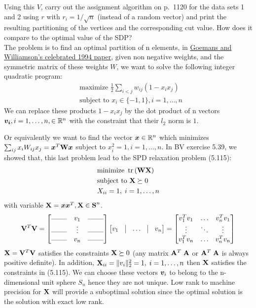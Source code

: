 \documentclass[11pt]{article}
\newcommand{\R}{\mathbb R}
\newcommand{\st}{\text{subject to }}
\newcommand{\minz}{\text{minimize }}
\begin{document}
\begin{enumerate}
\begin{enumerate}
 Using this $V$, carry out the assignment algorithm on p.~1120 for the data sets 1 and 2 using $r$ with $r_i=1/\sqrt{n}$ 
 (instead of a random vector) and print the resulting partitioning of the
 vertices and the corresponding cut value. How does it compare to the optimal value of the SDP?\\
 
 \medskip
The problem is to find an optimal partition of n elements, in  \href{http://www-math.mit.edu/~goemans/PAPERS/maxcut-jacm.pdf}{Goemans and Williamson's celebrated 1994 paper},
given non negative weights, and the symmetric matrix of these weights $W$,  
we want to solve the following integer quadratic program:
\begin{align*}
	& \text{maximize } \frac{1}{2} \sum_{i<j} w_{ij} (1- x_i x_j) \\
	& \st x_i \in \{-1,1\}, i=1, \ldots,n
\end{align*}
We can replace these products $1 -x_i x_j$ by the dot product of n vectors $\vect{v_i},  i=1, \ldots,n, \in \R^n$ with the constraint that their $l_2$ norm is $1$.

Or equivalently we want to find the vector $\vect{x} \in \R^n$ which minimizes $\sum_{ij} x_i W_{ij} x_j = \bm{x}^T {\mathbf W} \bm{x}$ subject to $x_i^2 = 1, i=1, \ldots,n$.
In BV exercise 5.39, we showed that, this last problem lead to the SPD relaxation problem (5.115):
\begin{align*}
	& \minz \tr{\mat{W} \mat{ X}} \\
	& \st\mat{X} \succeq 0\\
	&	X_{ii} = 1, \; i =1, \ldots, n
\end{align*}
with variable ${\mathbf X}= \bm{x} \bm{x}^T,  {\mathbf X} \in \textbf{S}^n $.
$$
	\mat{V}^T \mat{V} = 
		\begin{bmatrix}
			 \rule[0.5mm]{0.8cm}{0.1mm} 	& v_1 	&  \rule[0.5mm]{0.8cm}{0.1mm} \\
			\rule[0.5mm]{0.8cm}{0.1mm}	& \vdots 	&  \rule[0.5mm]{0.8cm}{0.1mm}	 \\
			\rule[0.5mm]{0.8cm}{0.1mm}	& v_n 	&  \rule[0.5mm]{0.8cm}{0.1mm} \\
		\end{bmatrix}
		\begin{bmatrix}
			v_1 & \vline & \ldots & \vline  & v_n
		\end{bmatrix}
		=
		\begin{bmatrix}
			v_1^T v_1 	& 	\ldots 	& 	v_n^T v_1 	\\
			\vdots		&	\ddots	& 	\vdots		\\
			v_1^T v_n	 	& 	\ldots 	& 	v_n^T v_n
		\end{bmatrix}
$$	
${\mathbf X} = {\mathbf V}^T {\mathbf V} $ satisfies the constraints ${\mathbf X} \succeq 0$ (any matrix ${\mathbf A}^T \; {\mathbf A}$ or ${\mathbf A}^T \; {\mathbf A}$ is always positive definite).
In addition, ${\mathbf X}_{ii}  = \|v_i\|_2^2 = 1, \; i =1, \ldots, n$ then ${\mathbf X}$ satisfies the constraints in (5.115).
We can choose these vectors $\bm{v}_i$  to belong to the n-dimensional unit sphere $S_n$ hence they are not unique.
Low rank to machine precision for  ${\mathbf X}$ will provide a suboptimal solution since the optimal solution is the solution with exact low rank.


\end{enumerate}
\end{enumerate}
\end{document}
